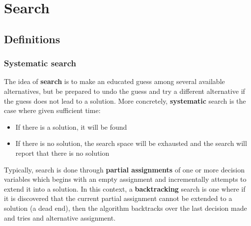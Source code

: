 \documentclass[CS4402-Notes.tex]{subfiles}
\begin{document}
\section{Search}
\subsection{Definitions}
\subsubsection{Systematic search}
The idea of \textbf{search} is to make an educated guess among several available alternatives, but be prepared to undo the guess and try a different alternative if the guess does not lead to a solution. 
\n
More concretely, \textbf{systematic} search is the case where given sufficient time:
\begin{itemize}
\item If there is a solution, it will be found
\item If there is no solution, the search space will be exhausted and the search will report that there is no solution
\end{itemize}
Typically, search is done through \textbf{partial assignments} of one or more decision variables which begins with an empty assignment and incrementally attempts to extend it into a solution. In this context, a \textbf{backtracking} search is one where if it is discovered that the current partial assignment cannot be extended to a solution (a dead end), then the algorithm backtracks over the last decision made and tries and alternative assignment. 
\end{document}
